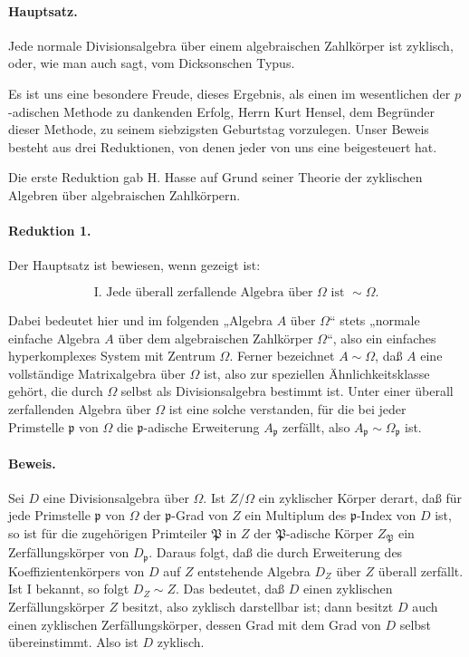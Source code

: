 \documentclass[11pt]{article}
\providecommand{\Om}{\Omega}
\begin{document}
\paragraph{Hauptsatz.}
Jede normale Divisionsalgebra über einem algebraischen Zahlkörper ist zyklisch, oder, wie man auch sagt, vom Dicksonschen Typus.

Es ist uns eine besondere Freude, dieses Ergebnis, als einen im wesentlichen der \(p\)-adischen Methode zu dankenden Erfolg, Herrn Kurt Hensel, dem Begründer dieser Methode, zu seinem siebzigsten Geburtstag vorzulegen. Unser Beweis besteht aus drei Reduktionen, von denen jeder von uns eine beigesteuert hat.

Die erste Reduktion gab H. Hasse auf Grund seiner Theorie der zyklischen Algebren über algebraischen Zahlkörpern.

\paragraph{Reduktion 1.}
Der Hauptsatz ist bewiesen, wenn gezeigt ist:

\[
\text{I. Jede überall zerfallende Algebra über }\Om\text{ ist } \sim\Om .
\]

Dabei bedeutet hier und im folgenden „Algebra \(A\) über \(\Om\)“ stets „normale einfache Algebra \(A\) über dem algebraischen Zahlkörper \(\Om\)“, also ein einfaches hyperkomplexes System mit Zentrum \(\Om\). Ferner bezeichnet \(A\sim\Om\), daß \(A\) eine vollständige Matrixalgebra über \(\Om\) ist, also zur speziellen Ähnlichkeitsklasse gehört, die durch \(\Om\) selbst als Divisionsalgebra bestimmt ist. Unter einer überall zerfallenden Algebra über \(\Om\) ist eine solche verstanden, für die bei jeder Primstelle \(\mathfrak p\) von \(\Om\) die \(\mathfrak p\)-adische Erweiterung \(A_{\mathfrak p}\) zerfällt, also \(A_{\mathfrak p}\sim \Om_{\mathfrak p}\) ist.

\paragraph{Beweis.}
Sei \(D\) eine Divisionsalgebra über \(\Om\). Ist \(Z/\Om\) ein zyklischer Körper derart, daß für jede Primstelle \(\mathfrak p\) von \(\Om\) der \(\mathfrak p\)-Grad von \(Z\) ein Multiplum des \(\mathfrak p\)-Index von \(D\) ist, so ist für die zugehörigen Primteiler \(\mathfrak P\) in \(Z\) der \(\mathfrak P\)-adische Körper \(Z_{\mathfrak P}\) ein Zerfällungskörper von \(D_{\mathfrak p}\). Daraus folgt, daß die durch Erweiterung des Koeffizientenkörpers von \(D\) auf \(Z\) entstehende Algebra \(D_Z\) über \(Z\) überall zerfällt. Ist I bekannt, so folgt \(D_Z\sim Z\). Das bedeutet, daß \(D\) einen zyklischen Zerfällungskörper \(Z\) besitzt, also zyklisch darstellbar ist; dann besitzt \(D\) auch einen zyklischen Zerfällungskörper, dessen Grad mit dem Grad von \(D\) selbst übereinstimmt. Also ist \(D\) zyklisch.
\end{document}
